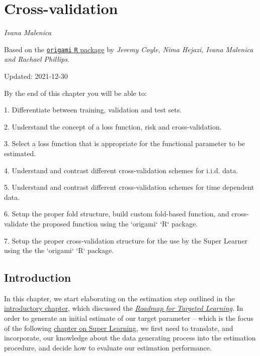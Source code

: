 \documentclass[
  12pt, krantz2,
]{krantz}
\newcommand{\passthrough}[1]{#1}
\newcommand{\1}{\mathbbm{1}}
\theoremstyle{definition}
\theoremstyle{definition}
\theoremstyle{definition}
\theoremstyle{definition}
\theoremstyle{remark}
\begin{document}
\hypertarget{origami}{%
\chapter{Cross-validation}\label{origami}}

\emph{Ivana Malenica}

Based on the \href{https://github.com/tlverse/origami}{\passthrough{\lstinline!origami!} \passthrough{\lstinline!R!} package}
by \emph{Jeremy Coyle, Nima Hejazi, Ivana Malenica and Rachael Phillips}.

Updated: 2021-12-30

\begin{VT1}



By the end of this chapter you will be able to:

1. Differentiate between training, validation and test sets.

2. Understand the concept of a loss function, risk and cross-validation.

3. Select a loss function that is appropriate for the functional parameter to be
   estimated.

4. Understand and contrast different cross-validation schemes for i.i.d. data.

5. Understand and contrast different cross-validation schemes for time dependent
   data.

6. Setup the proper fold structure, build custom fold-based function, and
   cross-validate the proposed function using the `origami` `R` package.

7. Setup the proper cross-validation structure for the use by the Super Learner
   using the the `origami` `R` package.

\end{VT1}

\hypertarget{introduction-1}{%
\section{Introduction}\label{introduction-1}}

In this chapter, we start elaborating on the estimation step outlined in the
\protect\hyperlink{intro}{introductory chapter}, which discussed the \protect\hyperlink{roadmap}{\emph{Roadmap for Targeted
Learning}}. In order to generate an initial estimate of our target
parameter -- which is the focus of the following \protect\hyperlink{sl3}{chapter on Super
Learning}, we first need to translate, and incorporate, our knowledge
about the data generating process into the estimation procedure, and decide how
to evaluate our estimation performance.
\end{document}
